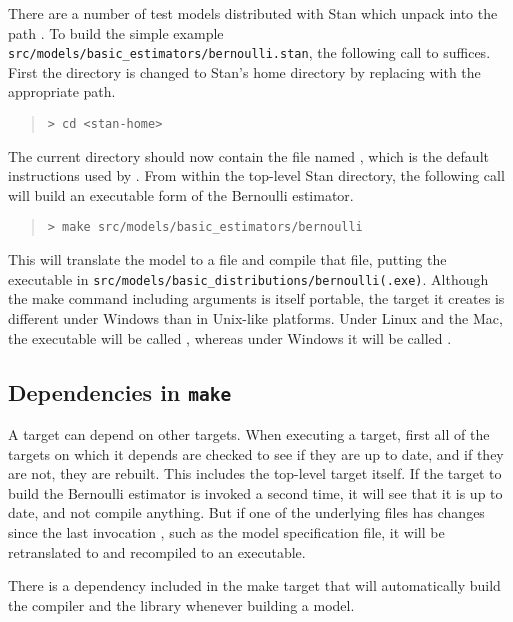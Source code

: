 There are a number of test models distributed with Stan which unpack
into the path .  To build the simple example
\nolinkurl{src/models/basic\_estimators/bernoulli.stan}, the following call
to  suffices.  First the directory is changed to Stan's home
directory by replacing  with the appropriate path.
%
\begin{quote}
\begin{Verbatim}[fontshape=sl,fontsize=\small]
> cd <stan-home>
\end{Verbatim}
\end{quote}
%
The current directory should now contain the file named
, which is the default instructions used by
.  From within the top-level Stan directory, the following call
will build an executable form of the Bernoulli estimator.
%
\begin{quote}
\begin{Verbatim}[fontshape=sl,fontsize=\small]
> make src/models/basic_estimators/bernoulli
\end{Verbatim}
\end{quote}
%
This will translate the model  to a \Cpp file and
compile that \Cpp file, putting the executable in
\nolinkurl{src/models/basic_distributions/bernoulli(.exe)}.  Although
the make command including arguments is itself portable, the target it
creates is different under Windows than in Unix-like platforms.  Under
Linux and the Mac, the executable will be called ,
whereas under Windows it will be called .

\subsection{Dependencies in {\tt\bfseries make}}

A  target can depend on other  targets.  When
executing a  target, first all of the targets on which it
depends are checked to see if they are up to date, and if they are
not, they are rebuilt.  This includes the top-level target itself.  If
the  target to build the Bernoulli estimator is invoked a
second time, it will see that it is up to date, and not compile
anything.  But if one of the underlying files has changes since the
last invocation , such as the model specification file, it
will be retranslated to \Cpp and recompiled to an executable.

There is a dependency included in the make target that will
automatically build the  compiler and the
 library whenever building a model.


